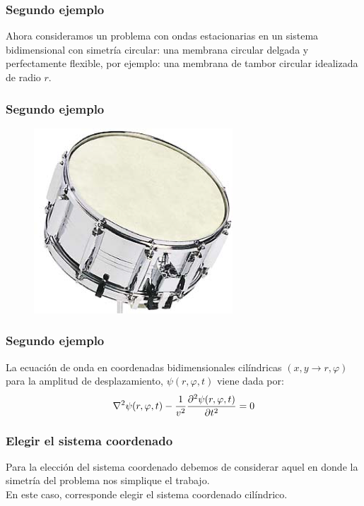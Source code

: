 \documentclass[12pt]{beamer}
\begin{document}
\begin{frame}
\frametitle{Segundo ejemplo}
Ahora consideramos un problema con ondas estacionarias en un sistema bidimensional con simetría circular: una membrana circular delgada y perfectamente flexible, por ejemplo: una membrana de tambor circular idealizada de radio $r$.
\end{frame}
\begin{frame}
\frametitle{Segundo ejemplo}
\begin{figure}[H]
  \centering
  \includegraphics[scale=0.75]{Imagenes/Tambor.png}
\end{figure}
\end{frame}
\begin{frame}
\frametitle{Segundo ejemplo}
La ecuación de onda en coordenadas bidimensionales cilíndricas $(x , y \rightarrow r, \varphi)$ para la amplitud de desplazamiento, $\psi (r, \varphi, t)$ viene dada por:
\pause
\begin{align*}
\laplacian \psi (r, \varphi, t) - \dfrac{1}{v^{2}} \pdv[2]{\psi (r, \varphi, t)}{t} = 0
\end{align*}
\end{frame}
\begin{frame}
\frametitle{Elegir el sistema coordenado}
Para la elección del sistema coordenado debemos de considerar aquel en donde la simetría del problema nos simplique el trabajo.
\\
\bigskip
\pause
En este caso, corresponde elegir el sistema coordenado cilíndrico.
\end{frame}
\end{document}
